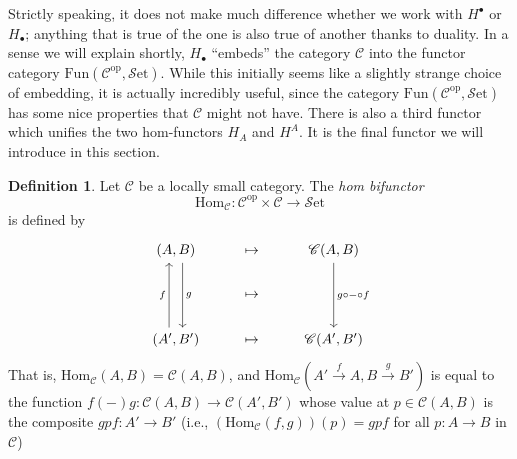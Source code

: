 \documentclass[10pt,oneside]{book}
\def\~#1{\mathscr{#1}}
\def\To#1{\xrightarrow{#1}}
\newcommand{\op}{\mathrm{op}}
\newcommand{\Hom}{\mathrm{Hom}}
\newcommand{\Fun}{\mathrm{Fun}}
\newcommand{\Set}{\~S\mathrm{et}}
\theoremstyle{plain}
\theoremstyle{definition}
\newtheorem{defn}[thm]{Definition}
\theoremstyle{remark}
\numberwithin{equation}{section}
\numberwithin{figure}{section}
\begin{document}
Strictly speaking, it does not make much difference whether we work with $H^\bullet$ or $H_\bullet$; anything that is true of the one is also true of another thanks to duality. In a sense we will explain shortly, $H_\bullet$ ``embeds'' the category $\~C$ into the functor category $\Fun(\~C^\op, \Set)$. While this initially seems like a slightly strange choice of embedding, it is actually incredibly useful, since the category $\Fun(\~C^\op, \Set)$ has some nice properties that $\~C$ might not have. There is also a third functor which unifies the two hom-functors $H_A$ and $H^A$. It is the final functor we will introduce in this section.

\begin{defn}
\label{defn:hom_bifun}
    Let $\~C$ be a locally small category. The \emph{hom bifunctor} 
    \[\Hom_{\~C}: \~C^\op \times \~C \to \Set\]
    is defined by
    \[\begin{tikzcd}
    {(A, B)} & \mapsto & {\~C(A, B)} \\
    & \mapsto \\
    {(A', B')} & \mapsto & {\~C(A', B')}
    \arrow["g", shift left=2, from=1-1, to=3-1]
    \arrow["{g \circ - \circ f}", from=1-3, to=3-3]
    \arrow["f", shift left=2, from=3-1, to=1-1]
\end{tikzcd}\]
That is, $\Hom_\~C(A, B) = \~C(A, B)$, and $\Hom_\~C(A' \To{f} A, B \To{g} B')$ is equal to the function $f(-)g: \~C(A, B) \to \~C(A', B')$ whose value at $p \in \~C(A, B)$ is the composite $gpf: A' \to B'$ (i.e., $\left(\Hom_\~C(f, g)\right)(p) = gpf$ for all $p: A \to B$ in $\~C$)
\end{defn}
\end{document}
